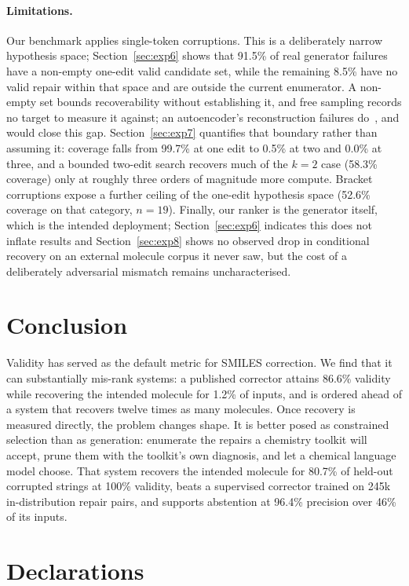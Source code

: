 \documentclass[11pt]{article}
\begin{document}
\paragraph{Limitations.}
Our benchmark applies single-token corruptions. This is a deliberately narrow
hypothesis space; Section~\ref{sec:exp6} shows that 91.5\% of real generator
failures have a non-empty one-edit valid candidate set, while the remaining
8.5\% have no valid repair within that space and are outside the current
enumerator. A non-empty set bounds recoverability without establishing it,
and free sampling records no target to measure it against; an autoencoder's
reconstruction failures do~\citep{park2026chemfixer}, and would close this gap. Section~\ref{sec:exp7}
quantifies that boundary rather than assuming it: coverage falls from 99.7\% at
one edit to 0.5\% at two and 0.0\% at three, and a bounded two-edit search
recovers much of the $k{=}2$ case (58.3\% coverage) only at roughly three orders
of magnitude more compute. Bracket corruptions expose a further ceiling of the
one-edit hypothesis space (52.6\% coverage on that category, $n=19$). Finally,
our ranker is the generator itself, which is the intended deployment;
Section~\ref{sec:exp6} indicates this does not inflate results and
Section~\ref{sec:exp8} shows no observed drop in conditional recovery on an
external molecule corpus it never saw, but the cost of a deliberately
adversarial mismatch remains uncharacterised.

\section{Conclusion}

Validity has served as the default metric for SMILES correction. We find that
it can substantially mis-rank systems: a published corrector attains 86.6\% validity
while recovering the intended molecule for 1.2\% of inputs, and is ordered ahead
of a system that recovers twelve times as many molecules. Once recovery is
measured directly, the problem changes shape. It is better posed as constrained
selection than as generation: enumerate the repairs a chemistry toolkit will
accept, prune them with the toolkit's own diagnosis, and let a chemical language
model choose. That system recovers the intended molecule for 80.7\% of held-out
corrupted strings at 100\% validity, beats a supervised corrector trained on
245k in-distribution repair pairs, and supports abstention at 96.4\% precision
over 46\% of its inputs.


\section*{Declarations}
\end{document}
